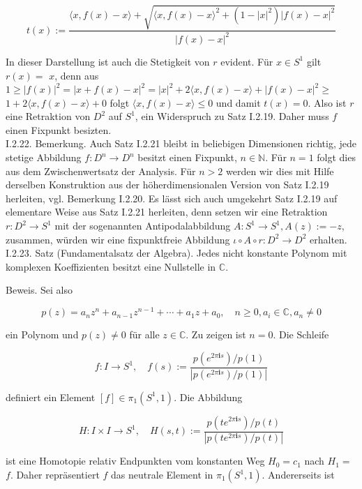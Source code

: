 \documentclass[10pt, letterpaper]{article}
\begin{document}
$$
t(x):=\frac{\langle x, f(x)-x\rangle+\sqrt{\langle x, f(x)-x\rangle^{2}+\left(1-|x|^{2}\right)|f(x)-x|^{2}}}{|f(x)-x|^{2}}
$$

In dieser Darstellung ist auch die Stetigkeit von $r$ evident. Für $x \in S^{1}$ gilt $r(x)=$ $x$, denn aus $1 \geq|f(x)|^{2}=|x+f(x)-x|^{2}=|x|^{2}+2\langle x, f(x)-x\rangle+|f(x)-x|^{2} \geq$ $1+2\langle x, f(x)-x\rangle+0$ folgt $\langle x, f(x)-x\rangle \leq 0$ und damit $t(x)=0$. Also ist $r$ eine Retraktion von $D^{2}$ auf $S^{1}$, ein Widerspruch zu Satz I.2.19. Daher muss $f$ einen Fixpunkt besizten.\\
I.2.22. Bemerkung. Auch Satz I.2.21 bleibt in beliebigen Dimensionen richtig, jede stetige Abbildung $f: D^{n} \rightarrow D^{n}$ besitzt einen Fixpunkt, $n \in \mathbb{N}$. Für $n=1$ folgt dies aus dem Zwischenwertsatz der Analysis. Für $n>2$ werden wir dies mit Hilfe derselben Konstruktion aus der höherdimensionalen Version von Satz I.2.19 herleiten, vgl. Bemerkung I.2.20. Es lässt sich auch umgekehrt Satz I.2.19 auf elementare Weise aus Satz I.2.21 herleiten, denn setzen wir eine Retraktion $r: D^{2} \rightarrow S^{1}$ mit der sogenannten Antipodalabbildung $A: S^{1} \rightarrow S^{1}, A(z):=-z$, zusammen, würden wir eine fixpunktfreie Abbildung $\iota \circ A \circ r: D^{2} \rightarrow D^{2}$ erhalten.\\
I.2.23. Satz (Fundamentalsatz der Algebra). Jedes nicht konstante Polynom mit komplexen Koeffizienten besitzt eine Nullstelle in $\mathbb{C}$.

Beweis. Sei also

$$
p(z)=a_{n} z^{n}+a_{n-1} z^{n-1}+\cdots+a_{1} z+a_{0}, \quad n \geq 0, a_{i} \in \mathbb{C}, a_{n} \neq 0
$$

ein Polynom und $p(z) \neq 0$ für alle $z \in \mathbb{C}$. Zu zeigen ist $n=0$. Die Schleife

$$
f: I \rightarrow S^{1}, \quad f(s):=\frac{p\left(e^{2 \pi \mathbf{i} s}\right) / p(1)}{\left|p\left(e^{2 \pi \mathbf{i} s}\right) / p(1)\right|}
$$

definiert ein Element $[f] \in \pi_{1}\left(S^{1}, 1\right)$. Die Abbildung

$$
H: I \times I \rightarrow S^{1}, \quad H(s, t):=\frac{p\left(t e^{2 \pi \mathbf{i} s}\right) / p(t)}{\left|p\left(t e^{2 \pi \mathbf{i} s}\right) / p(t)\right|}
$$

ist eine Homotopie relativ Endpunkten vom konstanten Weg $H_{0}=c_{1}$ nach $H_{1}=$ $f$. Daher repräsentiert $f$ das neutrale Element in $\pi_{1}\left(S^{1}, 1\right)$. Andererseits ist
\end{document}
